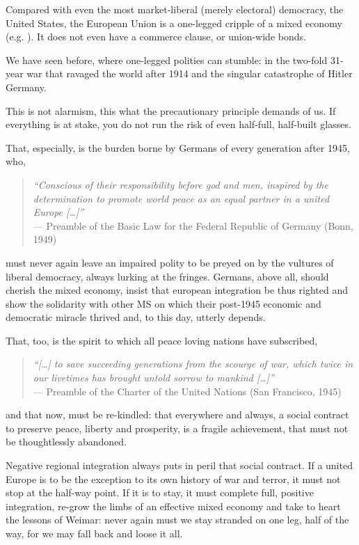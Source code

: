 \documentclass[11pt,a4paper,oneside,openright]{article}
\begin{document}
Compared with even the most market-liberal (merely electoral) democracy, the United States, the European Union is a one-legged cripple of a mixed economy (e.g. \citealt{Bordo2011}). 
It does not even have a commerce clause, or union-wide bonds.

We have seen before, where one-legged polities can stumble: 
in the two-fold 31-year war that ravaged the world after 1914 and the singular catastrophe of Hitler Germany.

This is not alarmism, this what the precautionary principle demands of us. 
If everything is at stake, you do not run the risk of even half-full, half-built glasses.

That, especially, is the burden borne by Germans of every generation after 1945, who, 
\begin{quote}
	\emph{``Conscious of their responsibility before god and men, inspired by the determination to promote world peace as an equal partner in a united Europe [\ldots]''} \\
	--- Preamble of the Basic Law for the Federal Republic of Germany (Bonn, 1949)
\end{quote}
must never again leave an impaired polity to be preyed on by the vultures of liberal democracy, always lurking at the fringes. 
Germans, above all, should cherish the mixed economy, insist that european integration be thus righted and show the solidarity with other \gls{MS} on which their post-1945 economic and democratic miracle thrived and, to this day, utterly depends.

That, too, is the spirit to which all peace loving nations have subscribed, 
\begin{quote}
	\emph{``[\ldots] to save succeeding generations from the scourge of war, which twice in our livetimes has brought untold sorrow to mankind [\ldots]''}\\
	--- Preamble of the Charter of the United Nations (San Francisco, 1945)
\end{quote}
and that now, must be re-kindled: 
that everywhere and always, a social contract to preserve peace, liberty and prosperity, is a fragile achievement, that must not be thoughtlessly abandoned.

Negative regional integration always puts in peril that social contract. 
If a united Europe is to be the exception to its own history of war and terror, it must not stop at the half-way point. 
If it is to stay, it must complete full, positive integration, re-grow the limbs of an effective mixed economy and take to heart the lessons of Weimar: 
never again must we stay stranded on one leg, half of the way, for we may fall back and loose it all.
\end{document}
